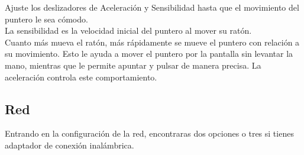 \documentclass[12pt,letterpaper]{book}
\begin{document}
\begin{itemize}
\begin{itemize}
Ajuste los deslizadores de Aceleración y Sensibilidad hasta que el movimiento del puntero le sea cómodo.\\

La sensibilidad es la velocidad inicial del puntero al mover su ratón.\\
Cuanto más mueva el ratón, más rápidamente se mueve el puntero con relación a su movimiento. Esto le ayuda a mover el puntero por la pantalla sin levantar la mano, mientras que le permite apuntar y pulsar de manera precisa. La aceleración controla este comportamiento.
\end{itemize}
\end{itemize}
\subsection{Red}
Entrando en la configuración de la red, encontraras dos opciones o tres si tienes adaptador de conexión inalámbrica.
\end{document}
